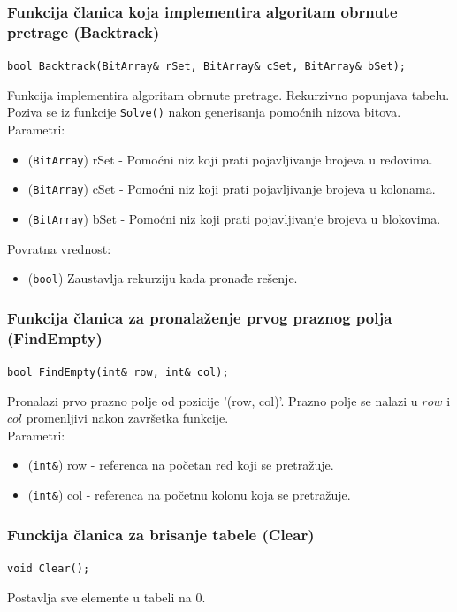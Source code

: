 \documentclass[a4paper]{article}
\begin{document}
    \subsubsection{Funkcija članica koja implementira algoritam obrnute pretrage (Backtrack)}
    {\parindent0pt
    \texttt{bool Backtrack(BitArray\& rSet, BitArray\& cSet, BitArray\& bSet);}
    }
    \par Funkcija implementira algoritam obrnute pretrage. Rekurzivno popunjava tabelu. Poziva se iz funkcije \texttt{Solve()} nakon generisanja pomoćnih nizova bitova.
    Parametri:
    \begin{itemize}
        \item (\texttt{BitArray}) rSet - Pomoćni niz koji prati pojavljivanje brojeva u redovima.
        \item (\texttt{BitArray}) cSet - Pomoćni niz koji prati pojavljivanje brojeva u kolonama.
        \item (\texttt{BitArray}) bSet - Pomoćni niz koji prati pojavljivanje brojeva u blokovima.
    \end{itemize}
    Povratna vrednost:
    \begin{itemize}
        \item (\texttt{bool}) Zaustavlja rekurziju kada pronađe rešenje.
    \end{itemize}

    \subsubsection{Funkcija članica za pronalaženje prvog praznog polja (FindEmpty)}
	\texttt{bool FindEmpty(int\& row, int\& col);}
    \par Pronalazi prvo prazno polje od pozicije '(row, col)'. Prazno polje se nalazi u $row$ i $col$ promenljivi nakon završetka funkcije.\\
    Parametri:
    \begin{itemize}
        \item (\texttt{int\&}) row - referenca na početan red koji se pretražuje.
        \item (\texttt{int\&}) col - referenca na početnu kolonu koja se pretražuje.
    \end{itemize}

    \subsubsection{Funckija članica za brisanje tabele (Clear)}
    \texttt{void Clear();}
    \par Postavlja sve elemente u tabeli na 0.
\end{document}
